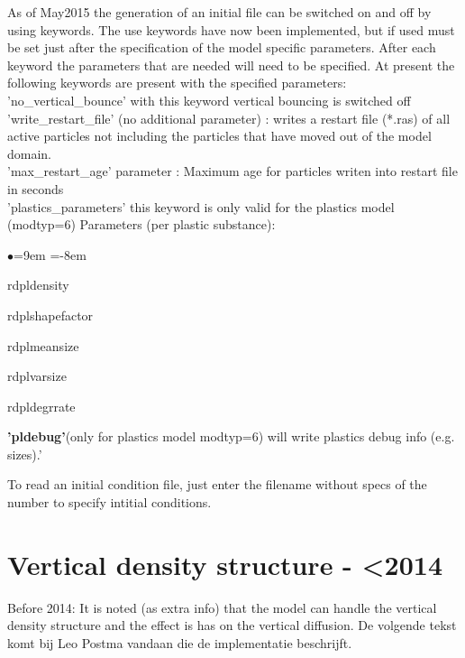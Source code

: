 \documentclass[english]{deltares_manual}
\begin{document}
As of May2015 the generation of an initial file can be switched on and off by using keywords. The use keywords have now been implemented, but if used must be set just after the specification of the model specific parameters. After each keyword the parameters that are needed will need to be specified. At present the following keywords are present with the specified parameters:
{'no\_vertical\_bounce'} with this keyword vertical bouncing is switched off\\
{'write\_restart\_file'} (no additional parameter) : writes a restart file (*.ras) of all active particles not including the particles that have moved out of the model domain.\\
{'max\_restart\_age'} parameter : Maximum age for particles writen into restart file in seconds\\
{'plastics\_parameters}' this keyword is only valid for the plastics model (modtyp=6)
Parameters (per plastic substance):
\begin{list}{$\bullet$}{\leftmargin=9em \itemindent=-8em}
	\item rdpldensity
	\item rdplshapefactor
	\item rdplmeansize
	\item rdplvarsize
	\item rdpldegrrate
\end{list}
\textbf{'pldebug'}(only for plastics model modtyp=6)
will write plastics debug info (e.g. sizes).'

To read an initial condition file, just enter the filename without specs of the number to specify intitial conditions.

\section{Vertical density structure - <2014}
Before 2014:
It is noted (as extra info) that the model can handle the vertical density structure and the effect is has on the vertical diffusion. De volgende tekst komt bij Leo Postma vandaan die de implementatie beschrijft.
\end{document}
